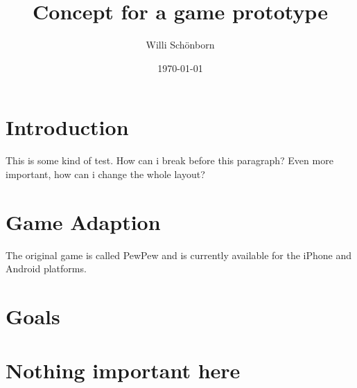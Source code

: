 \documentclass[a4paper]{article}
\title{Concept for a game prototype}
\author{Willi Schönborn}
\date{\today}
\begin{document}
\maketitle

\section*{Introduction}
This is some kind of test. How can i break before this paragraph? Even more important, how can i change the whole layout?

\section*{Game Adaption}
The original game is called PewPew and is currently available for the iPhone and Android platforms.

\section*{Goals}

\section*{Nothing important here}
\end{document}
